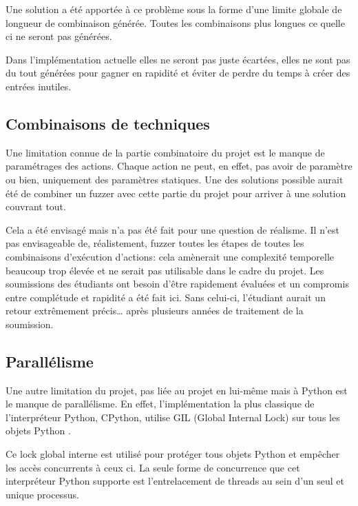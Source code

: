 \documentclass[a4paper]{report}
\begin{document}
Une solution a été apportée à ce problème sous la forme d'une limite globale de longueur de combinaison générée.
Toutes les combinaisons plus longues ce quelle ci ne seront pas générées.

Dans l'implémentation actuelle elles ne seront pas juste écartées, elles ne sont pas du tout générées pour gagner en rapidité et éviter de perdre du temps à créer des entrées inutiles.



\subsection{Combinaisons de techniques}
Une limitation connue de la partie combinatoire du projet est le manque de paramétrages des actions.
Chaque action ne peut, en effet, pas avoir de paramètre ou bien, uniquement des paramètres statiques.
Une des solutions possible aurait été de combiner un fuzzer avec cette partie du projet pour arriver à une solution couvrant tout.

Cela a été envisagé mais n'a pas été fait pour une question de réalisme.
Il n'est pas envisageable de, réalistement, fuzzer toutes les étapes de toutes les combinaisons d'exécution d'actions: cela amènerait une complexité temporelle beaucoup trop élevée et ne serait pas utilisable dans le cadre du projet.
Les soumissions des étudiants ont besoin d'être rapidement évaluées et un compromis entre complétude et rapidité a été fait ici.
Sans celui-ci, l'étudiant aurait un retour extrêmement précis… après plusieurs années de traitement de la soumission.



\subsection{Parallélisme}

Une autre limitation du projet, pas liée au projet en lui-même mais à Python est le manque de parallélisme.
En effet, l'implémentation la plus classique de l'interpréteur Python, CPython, utilise GIL (Global Internal Lock) sur tous les objets Python \cite{archiveThreadStateGIDPython}.

Ce lock global interne est utilisé pour protéger tous objets Python et empêcher les accès concurrents à ceux ci.
La seule forme de concurrence que cet interpréteur Python supporte est l'entrelacement de threads au sein d'un seul et unique processus.
\end{document}

